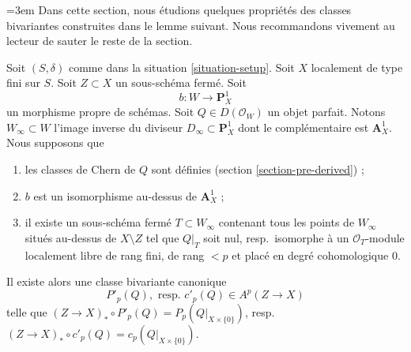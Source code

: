 {\emergencystretch=3em\noindent
Dans cette section, nous étudions quelques propriétés des classes bivariantes
construites dans le lemme suivant. Nous recommandons vivement au
lecteur de sauter le reste de la section.\par}

\begin{lemma}
\label{lemma-localized-chern-pre}
Soit $(S, \delta)$ comme dans la situation \ref{situation-setup}. Soit $X$
localement de type fini sur $S$. Soit $Z \subset X$ un sous-schéma fermé.
Soit
$$
b : W \longrightarrow \mathbf{P}^1_X
$$
un morphisme propre de schémas. Soit $Q \in D(\mathcal{O}_W)$ un
objet parfait. Notons $W_\infty \subset W$ l'image inverse du diviseur
$D_\infty \subset \mathbf{P}^1_X$ dont le complémentaire est $\mathbf{A}^1_X$.
Nous supposons que
\begin{enumerate}
\item[(A0)] les classes de Chern de $Q$ sont définies
(section \ref{section-pre-derived}) ;
\item[(A1)] $b$ est un isomorphisme au-dessus de $\mathbf{A}^1_X$ ;
\item[(A2)] il existe un sous-schéma fermé $T \subset W_\infty$
contenant tous les points de $W_\infty$ situés au-dessus de $X \setminus Z$ tel que
$Q|_T$ soit nul, resp.\ isomorphe à un
$\mathcal{O}_T$-module localement libre de rang fini, de rang $< p$ et placé en degré cohomologique $0$.
\end{enumerate}
Il existe alors une classe bivariante canonique
$$
P'_p(Q),\text{ resp. }c'_p(Q) \in A^p(Z \to X)
$$
telle que
$(Z \to X)_* \circ P'_p(Q) = P_p(Q|_{X \times \{0\}})$,
resp.\ $(Z \to X)_* \circ c'_p(Q) = c_p(Q|_{X \times \{0\}})$.
\end{lemma}


